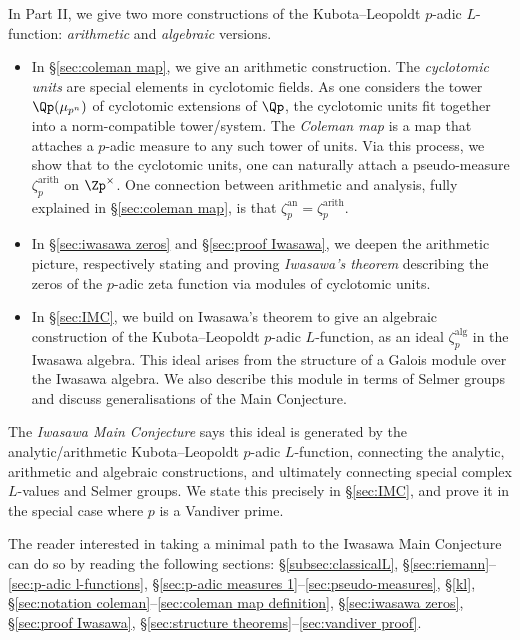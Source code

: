 \documentclass[a4paper,10pt, english, reqno]{smfart}
\numberwithin{equation}{section}
\begin{document}
In Part II, we give two more constructions of the Kubota--Leopoldt $p$-adic $L$-function: \emph{arithmetic} and \emph{algebraic} versions.
\begin{itemize}
	\item[$\bullet$] In \S\ref{sec:coleman map}, we give an arithmetic construction. The \emph{cyclotomic units} are special elements in cyclotomic fields. As one considers the tower $\Qp(\mu_{p^n})$ of cyclotomic extensions of $\Qp$, the cyclotomic units fit together into a norm-compatible tower/system. The \emph{Coleman map} is a map that attaches a $p$-adic measure to any such tower of units. Via this process, we show that to the cyclotomic units, one can naturally attach a pseudo-measure $\zeta_p^{\mathrm{arith}}$ on $\Zp^\times$. One connection between arithmetic and analysis, fully explained in \S\ref{sec:coleman map}, is that $\zeta_p^{\mathrm{an}} = \zeta_p^{\mathrm{arith}}$.
 
    \item[$\bullet$] In \S\ref{sec:iwasawa zeros} and \S\ref{sec:proof Iwasawa}, we deepen the arithmetic picture, respectively stating and proving \emph{Iwasawa's theorem} describing the zeros of the $p$-adic zeta function via modules of cyclotomic units.
 
	\item[$\bullet$] In \S\ref{sec:IMC}, we build on Iwasawa's theorem to give an algebraic construction of the Kubota--Leopoldt $p$-adic $L$-function, as an ideal $\zeta_p^{\mathrm{alg}}$ in the Iwasawa algebra. This ideal arises from the structure of a Galois module over the Iwasawa algebra. We also  describe this module in terms of Selmer groups and discuss generalisations of the Main Conjecture.
\end{itemize}
	
	The \emph{Iwasawa Main Conjecture} says this ideal is generated by the analytic/arithmetic Kubota--Leopoldt $p$-adic $L$-function, connecting the analytic, arithmetic and algebraic constructions, and ultimately connecting special complex $L$-values and Selmer groups. We state this precisely in \S\ref{sec:IMC}, and prove it in the special case where $p$ is a Vandiver prime.

  The reader interested in taking a minimal path to the Iwasawa Main Conjecture can do so by reading the following sections: \S\ref{subsec:classicalL}, \S\ref{sec:riemann}--\ref{sec:p-adic l-functions}, \S\ref{sec:p-adic measures 1}--\ref{sec:pseudo-measures}, \S\ref{kl}, \S\ref{sec:notation coleman}--\ref{sec:coleman map definition}, \S\ref{sec:iwasawa zeros}, \S\ref{sec:proof Iwasawa}, \S\ref{sec:structure theorems}--\ref{sec:vandiver proof}. 
 
\end{document}
